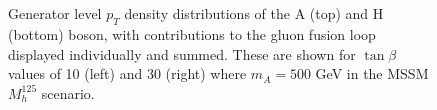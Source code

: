 \begin{figure}[p!]
\centering
     \\
     \\
\caption[Plots of the gluon fusion generator level $\pT$ distributions, when changing the MSSM parameters.]{Generator level $p_{T}$ density distributions of the A (top) and H (bottom) boson, with contributions to the gluon fusion loop displayed individually and summed. These are shown for $\tan\beta$ values of 10 (left) and 30 (right) where $m_{A} = 500$ GeV in the MSSM $M_{h}^{125}$ scenario.}
\label{fig:mssm_sig}
\end{figure}

